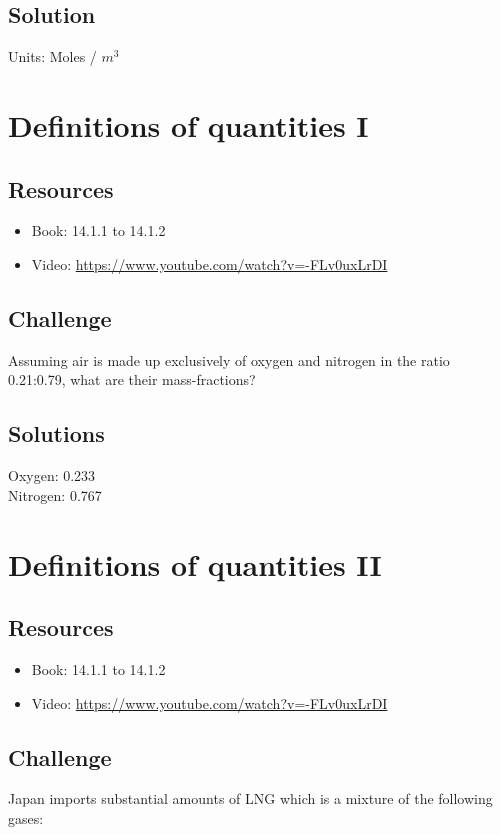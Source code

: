 \subsection*{Solution}
Units: Moles / $m^3$





\newpage
\section{Definitions of quantities I}

\subsection*{Resources}
\begin{itemize}
    \item Book: 14.1.1 to 14.1.2
    \item Video: \url{https://www.youtube.com/watch?v=-FLv0uxLrDI}
\end{itemize}

\subsection*{Challenge}
Assuming air is made up exclusively of oxygen and nitrogen in the ratio 0.21:0.79, what are their mass-fractions?

\subsection*{Solutions}
Oxygen: 0.233 \\
Nitrogen: 0.767




\newpage
\section{Definitions of quantities II}

\subsection*{Resources}
\begin{itemize}
    \item Book: 14.1.1 to 14.1.2
    \item Video: \url{https://www.youtube.com/watch?v=-FLv0uxLrDI}
\end{itemize}

\subsection*{Challenge}
Japan imports substantial amounts of LNG which is a mixture of the following gases:

